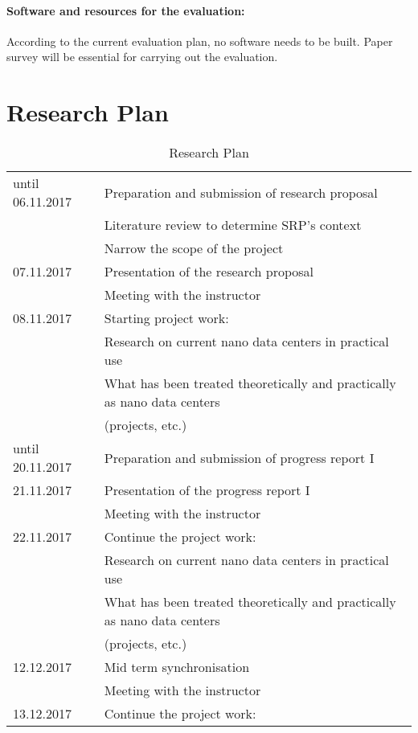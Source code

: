 \documentclass[sigchi-a, authorversion]{acmart}
\begin{document}
\paragraph{Software and resources for the evaluation:}
According to the current evaluation plan, no software needs to be built. Paper survey will be essential for carrying out the evaluation.

\section{Research Plan} %
\begin{table}[H]
  \caption{Research Plan}
  \label{tab:researchPlan}
  \begin{tabular}{ll}
    \toprule
    until 06.11.2017 & Preparation and submission of research proposal \\
    & Literature review to determine SRP's context \\
    & Narrow the scope of the project \\
    \hline
    07.11.2017 & Presentation of the research proposal \\
    & Meeting with the instructor \\
    \hline
    08.11.2017 & Starting project work: \\
    & Research on current nano data centers in practical use \\
    & What has been treated theoretically and practically as nano data centers \\
    & (projects, etc.) \\
    \hline
    until 20.11.2017 & Preparation and submission of progress report I \\
    \hline
    21.11.2017 & Presentation of the progress report I \\
    & Meeting with the instructor \\
    \hline
    22.11.2017 & Continue the project work: \\
    & Research on current nano data centers in practical use \\
    & What has been treated theoretically and practically as nano data centers \\
    & (projects, etc.) \\
    \hline
    12.12.2017 & Mid term synchronisation \\
    & Meeting with the instructor \\
    \hline
    13.12.2017 & Continue the project work: \\

\end{tabular}
\end{table}
\end{document}
